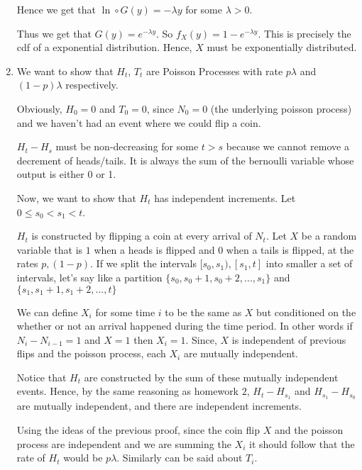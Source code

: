 \documentclass[12pt]{article}
\begin{document}
\begin{enumerate}[start=1,label={\bfseries Problem \arabic*:},leftmargin=1in]
    Hence we get that $\ln \circ G(y) = -\lambda y$ for some $\lambda > 0$. 

    Thus we get that $G(y) = e^{-\lambda y}$. So $f_{X}(y) = 1 - e^{-\lambda y}$. This is precisely the cdf of a exponential distribution. 
    Hence, $X$ must be exponentially distributed. 


    \item We want to show that $H_{t}$, $T_{t}$ are Poisson Processes with rate $p\lambda$ and $(1-p)\lambda$ respectively. 
    
    Obviously, $H_{0} = 0$ and $T_{0} = 0$, since $N_{0} = 0$ (the underlying poisson process) and we haven't had an event where we could flip a coin.
    
    $H_{t} - H_{s}$ must be non-decreasing for some $t > s$ because we cannot remove a decrement of heads/tails. It is always the sum of the bernoulli variable whose output is either 0 or 1.

     Now, we want to show that $H_{t}$ has independent increments. Let $0 \leq s_{0} < s_{1} < t$.

    $H_{t}$ is constructed by flipping a coin at every arrival of $N_{t}$. 
    Let $X$ be a random variable that is $1$ when a heads is flipped and $0$ when a tails is flipped, at the rates $p, (1-p)$. 
    If we split the intervals $[s_{0}, s_{1}), [s_{1}, t]$ into 
    smaller a set of intervals, let's say like a partition $\{s_{0}, s_{0} + 1, s_{0} + 2, ..., s_{1}\}$ and $\{s_{1}, s_{1} + 1, s_{1} + 2, ..., t\}$
    
    We can define $X_{i}$ for some time $i$ to be the same as $X$ but conditioned on the whether or not an arrival happened during the time period. In other words if $N_{i} - N_{i-1} = 1$ and $X = 1$ then $X_{i} = 1$. 
    Since, $X$ is independent of previous flips and the poisson process, each $X_{i}$ are mutually independent. 

    Notice that $H_{t}$ are constructed by the sum of these mutually independent events. Hence, by the same reasoning as homework $2$, $H_{t} - H_{s_{1}}$ and $H_{s_{1}} - H_{s_{0}}$ are mutually independent, 
    and there are independent increments. 

    Using the ideas of the previous proof, since the coin flip $X$ and the poisson process are independent and we are summing the $X_{i}$ it should follow that the rate of $H_{t}$ would be $p\lambda$. 
    Similarly can be said about $T_{i}$. 
    


\end{enumerate}
\end{document}
